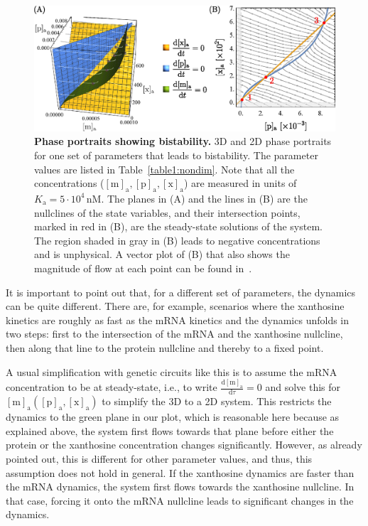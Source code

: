 \documentclass[10pt,letterpaper]{article}
\newcommand{\unit}[1]{\,\mathrm{#1}}
\newcommand{\n}[1]{\mathrm{#1}}
\newcommand{\dd}[2]{\frac{\mathrm{d} #1}{\mathrm{d} #2}}
\begin{document}
\begin{figure}%
	\centering
	\includegraphics[width=1\textwidth]{media/Bistability.eps}
	\caption{{\bf Phase portraits showing bistability.}
		3D and 2D phase portraits for one set of parameters that leads to
		bistability. The parameter values are listed in
		Table~\ref{table1:nondim}. Note that all the concentrations
		($\n{[m]_a}, \n{[p]_a}, \n{[x]_a}$) are measured in units of
		$K_{\n{a}} = 5 \cdot 10^{4} \unit{nM}$. The planes in (A) and the
		lines in (B) are the nullclines of the state variables, and their
		intersection points, marked in red in (B), are the steady-state
		solutions of the system. The region shaded in gray in (B) leads to
		negative concentrations and is unphysical. A vector plot of (B) that
		also shows the magnitude of flow at each point can be found
		in~.}
	\label{fig4:bistability}
\end{figure}

It is important to point out that, for a different set of parameters, the
dynamics can be quite different. There are, for example, scenarios where the
xanthosine kinetics are roughly as fast as the mRNA kinetics and the
dynamics unfolds in two steps: first to the intersection of the mRNA and the
xanthosine nullcline, then along that line to the protein nullcline and
thereby to a fixed point.

A usual simplification with genetic circuits like this is to assume the mRNA
concentration to be at steady-state, i.e., to write $\dd{\n{[m]_a}}{\tau}=0$
and solve this for $\n{[m]_a}(\n{[p]_a},\n{[x]_a})$ to simplify the 3D to a
2D system. This restricts the dynamics to the green plane in our plot, which
is reasonable here because as explained above, the system first flows
towards that plane before either the protein or the xanthosine concentration
changes significantly. However, as already pointed out, this is different
for other parameter values, and thus, this assumption does not hold in general.
If the xanthosine dynamics are faster than the mRNA dynamics, the
system first flows towards the xanthosine nullcline. In that case, forcing
it onto the mRNA nullcline leads to significant changes in the dynamics.
\end{document}
